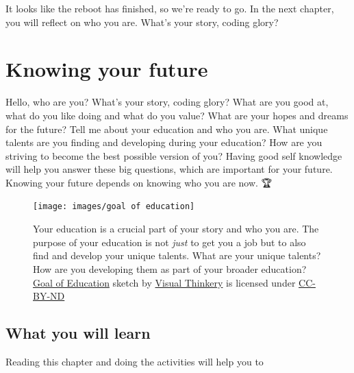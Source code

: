 \documentclass[
]{book}
\begin{document}
It looks like the reboot has finished, so we're ready to go. In the next chapter, you will reflect on who you are. What's your story, coding glory?

\hypertarget{knowing}{%
\chapter{Knowing your future}\label{knowing}}

Hello, who are you? What's your story, coding glory? What are you good at, what do you like doing and what do you value? What are your hopes and dreams for the future? Tell me about your education and who you are. What unique talents are you finding and developing during your education? How are you striving to become the best possible version of you? Having good self knowledge will help you answer these big questions, which are important for your future. Knowing your future depends on knowing who you are now. 🏆

\begin{figure}

{\centering \texttt{[image: images/goal of education]} 

}

\caption{Your education is a crucial part of your story and who you are. The purpose of your education is not \emph{just} to get you a job but to also find and develop your unique talents. What are your unique talents? How are you developing them as part of your broader education? \href{https://www.flickr.com/photos/122135325@N06/16627558943/}{Goal of Education} sketch by \href{https://visualthinkery.com/}{Visual Thinkery} is licensed under \href{https://creativecommons.org/licenses/by-nd/4.0/}{CC-BY-ND}}\label{fig:goal-fig}
\end{figure}



\hypertarget{ilo2}{%
\section{What you will learn}\label{ilo2}}

Reading this chapter and doing the activities will help you to
\end{document}
